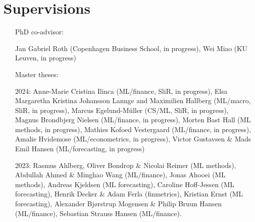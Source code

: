 \documentclass[10pt]{article}
\begin{document}
	\section*{Supervisions}
	\vspace{-0.5em}
		\begin{itemize}[leftmargin=4.5em]
		\setlength\itemsep{-0.1em}
		\item[] \hspace{-2.85em}PhD co-advisor: 
		\item[] Jan Gabriel Roth (Copenhagen Business School, in progress), Wei Miao (KU Leuven, in progress)
		\setlength\itemsep{-0.1em}
		\item[] \hspace{-2.85em}Master theses: 
		\item[2024:] Anne-Marie Cristina Ilinca (ML/finance, SliR, in progress), Elsa Margaretha Kristina Johansson Lannge and Maximilien Hallberg (ML/macro, SliR, in progress), Marcus Egelund-M{\"u}ller (CS/ML, SliR, in progress), Magnus Brondbjerg Nielsen (ML/finance, in progress), Morten Bast Hall (ML methods, in progress), Mathies Kofoed Vestergaard (ML/finance, in progress), Amalie Hvidemose (ML/econometrics, in progress), Victor Gustavsen \& Mads Emil Hansen (ML/forecasting, in progress)
		\item[2023:] Rasmus Ahlberg, Oliver Bondrop \& Nicolai Reimer (ML methods), Abdullah Ahmed \& Minghao Wang (ML/finance), Jonas Ahooei (ML methods), Andreas Kjeldsen (ML forecasting), Caroline Hoff-Jessen (ML forecasting), Henrik Decker \& Adam Ferla (finmetrics), Kristian Ernst (ML forecasting), Alexander Bj{\o}rstrup Mogensen \& Philip Bruun Hansen (ML/finance), Sebastian Strauss Hansen (ML/finance).
	\end{itemize}

	\vspace{-0.5em}
\end{document}
